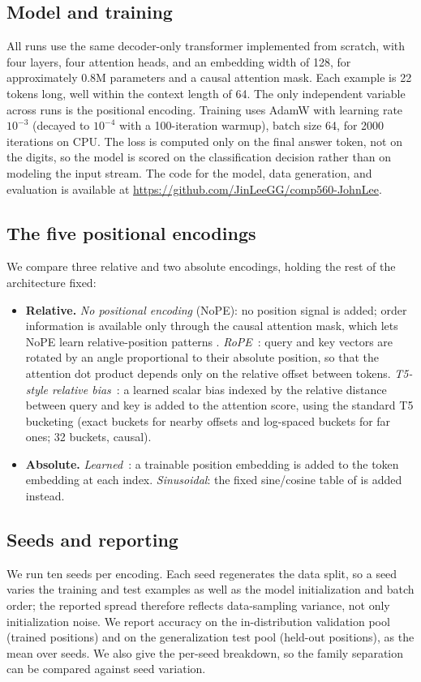 \documentclass{article}
\begin{document}
\subsection{Model and training}
All runs use the same decoder-only transformer implemented from scratch, with
four layers, four attention heads, and an embedding width of 128, for
approximately 0.8M parameters and a causal attention mask. Each example is 22
tokens long, well within the context length of 64. The only independent variable
across runs is the positional encoding. Training uses AdamW with learning rate $10^{-3}$ (decayed
to $10^{-4}$ with a 100-iteration warmup), batch size 64, for 2000 iterations on
CPU. The loss is computed only on the final answer token, not on the digits, so
the model is scored on the classification decision rather than on modeling the
input stream. The code for the model, data generation, and evaluation is available
at \url{https://github.com/JinLeeGG/comp560-JohnLee}.

\subsection{The five positional encodings}
We compare three relative and two absolute encodings, holding the rest of the
architecture fixed:
\begin{itemize}
  \item \textbf{Relative.} \emph{No positional encoding} (NoPE): no position
  signal is added; order information is available only through the causal
  attention mask, which lets NoPE learn relative-position patterns
  \citep{kazemnejad2023impact}. \emph{RoPE}~\citep{su2021roformer}: query and key vectors are
  rotated by an angle proportional to their absolute position, so that the
  attention dot product depends only on the relative offset between tokens.
  \emph{T5-style relative bias}~\citep{raffel2020t5}: a learned scalar bias
  indexed by the relative distance between query and key is added to the attention
  score, using the standard T5 bucketing (exact buckets for nearby offsets and
  log-spaced buckets for far ones; 32 buckets, causal).
  \item \textbf{Absolute.} \emph{Learned}~\citep{radford2018improving}: a
  trainable position embedding is added to the token embedding at each index.
  \emph{Sinusoidal}: the fixed sine/cosine table of \citet{vaswani2017attention}
  is added instead.
\end{itemize}

\subsection{Seeds and reporting}
We run ten seeds per encoding. Each seed regenerates the data split, so a seed
varies the training and test examples as well as the model initialization and
batch order; the reported spread therefore reflects data-sampling variance, not
only initialization noise. We report accuracy on the in-distribution validation
pool (trained positions) and on the generalization test pool (held-out positions),
as the mean over seeds. We also give the per-seed breakdown, so the family
separation can be compared against seed variation.
\end{document}
